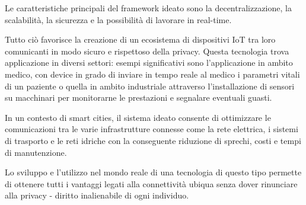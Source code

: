 Le caratteristiche principali del framework ideato sono la decentralizzazione, la scalabilità,
la sicurezza e la possibilità di lavorare in real-time.

Tutto ciò favorisce la creazione di un ecosistema di dispositivi IoT tra loro comunicanti in modo sicuro e
rispettoso della privacy. Questa tecnologia trova applicazione in diversi settori: esempi significativi sono l'applicazione in ambito medico, 
con device in grado di inviare in tempo reale al medico i parametri vitali di un paziente o quella in ambito industriale 
attraverso l'installazione di sensori su macchinari per monitorarne le prestazioni e segnalare eventuali guasti. 

In un contesto di smart cities, il sistema ideato consente di ottimizzare le comunicazioni tra le varie
infrastrutture connesse come la rete elettrica, i sistemi di trasporto e le reti idriche
con la conseguente riduzione di sprechi, costi e tempi di manutenzione.

Lo sviluppo e l'utilizzo nel mondo reale di una tecnologia di questo tipo permette di ottenere tutti i vantaggi 
legati alla connettività ubiqua senza dover rinunciare alla privacy - diritto inalienabile di ogni individuo.